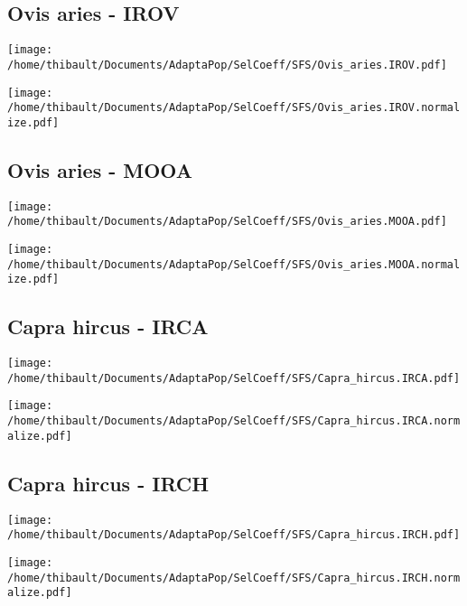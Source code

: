 \subsection{Ovis aries - IROV} 
 
\begin{minipage}{0.49\linewidth} 
\texttt{[image: /home/thibault/Documents/AdaptaPop/SelCoeff/SFS/Ovis\_aries.IROV.pdf]} 
\end{minipage}
\begin{minipage}{0.49\linewidth}
\texttt{[image: /home/thibault/Documents/AdaptaPop/SelCoeff/SFS/Ovis\_aries.IROV.normalize.pdf]} 
\end{minipage}
\subsection{Ovis aries - MOOA} 
 
\begin{minipage}{0.49\linewidth} 
\texttt{[image: /home/thibault/Documents/AdaptaPop/SelCoeff/SFS/Ovis\_aries.MOOA.pdf]} 
\end{minipage}
\begin{minipage}{0.49\linewidth}
\texttt{[image: /home/thibault/Documents/AdaptaPop/SelCoeff/SFS/Ovis\_aries.MOOA.normalize.pdf]} 
\end{minipage}
\subsection{Capra hircus - IRCA} 
 
\begin{minipage}{0.49\linewidth} 
\texttt{[image: /home/thibault/Documents/AdaptaPop/SelCoeff/SFS/Capra\_hircus.IRCA.pdf]} 
\end{minipage}
\begin{minipage}{0.49\linewidth}
\texttt{[image: /home/thibault/Documents/AdaptaPop/SelCoeff/SFS/Capra\_hircus.IRCA.normalize.pdf]} 
\end{minipage}
\subsection{Capra hircus - IRCH} 
 
\begin{minipage}{0.49\linewidth} 
\texttt{[image: /home/thibault/Documents/AdaptaPop/SelCoeff/SFS/Capra\_hircus.IRCH.pdf]} 
\end{minipage}
\begin{minipage}{0.49\linewidth}
\texttt{[image: /home/thibault/Documents/AdaptaPop/SelCoeff/SFS/Capra\_hircus.IRCH.normalize.pdf]} 
\end{minipage}
